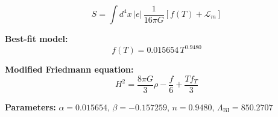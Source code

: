
\begin{equation}
  S = \int d^4x \, |e| \, \frac{1}{16\pi G} \left[ f(T) + \mathcal{L}_m \right]
\end{equation}

\textbf{Best-fit model:}
\begin{equation}
  f(T) = 0.015654 \, T^{0.9480}
\end{equation}

\textbf{Modified Friedmann equation:}
\begin{equation}
  H^2 = \frac{8\pi G}{3} \rho - \frac{f}{6} + \frac{T f_T}{3}
\end{equation}

\textbf{Parameters:}
$\alpha = 0.015654$, \quad
$\beta = -0.157259$, \quad
$n = 0.9480$, \quad
$\Lambda_{\text{BI}} = 850.2707$